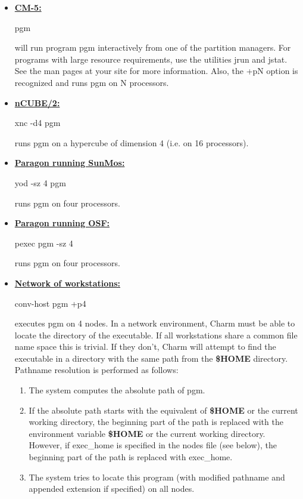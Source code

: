\begin{itemize}

\item \underline{\bf CM-5:} 
	\begin{tabbing}
	{\fexec pgm}
	\end{tabbing}
	will run program {\fparm pgm} interactively from one of the partition 
	managers.  For programs with large resource requirements, use the utilities
	{\fexec jrun} and {\fexec jstat}. See the man pages at your site for
	more information. Also, the {\fexec +pN} option is recognized and runs {\fexec pgm} on {\fexec N} processors.

\item \underline{\bf nCUBE/2:} 
	\begin{tabbing}
	{\fexec xnc -d4 pgm}
	\end{tabbing}
	runs {\fparm pgm} on a hypercube of dimension 4 (i.e. on 16 processors). 

\item \underline{\bf Paragon running SunMos:} 
	\begin{tabbing}
	{\fexec yod -sz 4 pgm}
	\end{tabbing}
	runs {\fparm pgm} on four processors.

\item \underline{\bf Paragon running OSF:} 
	\begin{tabbing}
	{\fexec pexec pgm -sz 4}
	\end{tabbing}
	runs {\fparm pgm} on four processors.

\item \underline{\bf Network of workstations:} 
	\begin{tabbing}
	{\fexec conv-host pgm +p4}
	\end{tabbing}
	executes {\fparm pgm} on 4 nodes.  In a network environment, Charm must
	be able to locate the directory of the executable.  If all workstations
	share a common file name space this is trivial.  If they don't, Charm
	will attempt to find the executable in a directory with the same path
	from the {\bf \$HOME} directory.  Pathname resolution is performed as 
	follows:
	\begin{enumerate}
		\item The system computes the absolute path of {\fexec pgm}.
		\item If the absolute path starts with the equivalent of {\bf \$HOME} 
			or the current working directory, the beginning part of the path 
			is replaced with the environment variable {\bf \$HOME} or the 
			current working directory. However, if {\fparm exec\_home} is 
            specified in the nodes file (see below), the beginning part of
            the path is replaced with {\fparm exec\_home}.
		\item The system tries to locate this program (with modified 
			pathname and appended extension if specified) on all nodes.
	\end{enumerate}


\end{itemize}
